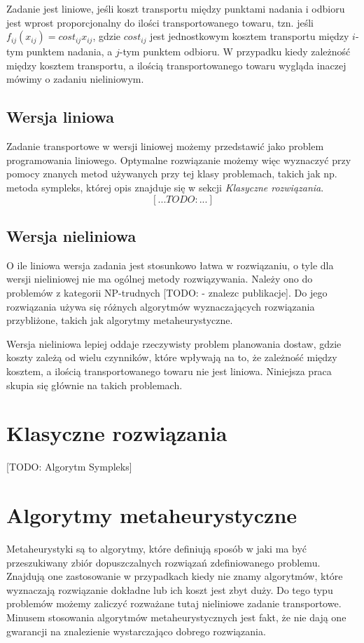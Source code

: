 Zadanie jest liniowe, jeśli koszt transportu między punktami nadania i odbioru jest wprost proporcjonalny 
do ilości transportowanego towaru, tzn. jeśli $f_{ij}(x_{ij}) = cost_{ij} x_{ij}$, gdzie $cost_{ij}$ jest jednostkowym kosztem transportu 
między $i$-tym punktem nadania, a $j$-tym punktem odbioru. W przypadku kiedy zależność między kosztem transportu, a ilością transportowanego 
towaru wygląda inaczej mówimy o zadaniu nieliniowym.

\subsection{Wersja liniowa}
Zadanie transportowe w wersji liniowej możemy przedstawić jako problem programowania liniowego. Optymalne rozwiązanie możemy więc wyznaczyć 
przy pomocy znanych metod używanych przy tej klasy problemach, takich jak np. metoda sympleks, której opis znajduje się w sekcji 
\textit{Klasyczne rozwiązania}.
$$[...TODO:...]$$

\subsection{Wersja nieliniowa}
O ile liniowa wersja zadania jest stosunkowo łatwa w rozwiązaniu, o tyle dla wersji nieliniowej nie ma ogólnej metody rozwiązywania. Należy 
ono do problemów z kategorii NP-trudnych [TODO: - znalezc publikacje]. Do jego rozwiązania używa się różnych algorytmów wyznaczających 
rozwiązania przybliżone, takich jak algorytmy metaheurystyczne. 

Wersja nieliniowa lepiej oddaje rzeczywisty problem planowania dostaw, gdzie koszty zależą od wielu czynników, które wpływają na to, 
że zależność między kosztem, a ilością transportowanego towaru nie jest liniowa. Niniejsza praca skupia się głównie na takich problemach.


\section{Klasyczne rozwiązania}
[TODO: Algorytm Sympleks]

\section{Algorytmy metaheurystyczne}
Metaheurystyki są to algorytmy, które definiują sposób w jaki ma być przeszukiwany zbiór dopuszczalnych rozwiązań zdefiniowanego problemu. 
Znajdują one zastosowanie w przypadkach kiedy nie znamy algorytmów, które wyznaczają rozwiązanie dokładne lub ich koszt jest zbyt duży. Do tego 
typu problemów możemy zaliczyć rozważane tutaj nieliniowe zadanie transportowe. Minusem stosowania algorytmów metaheurystycznych jest fakt, że 
nie dają one gwarancji na znalezienie wystarczająco dobrego rozwiązania. 

